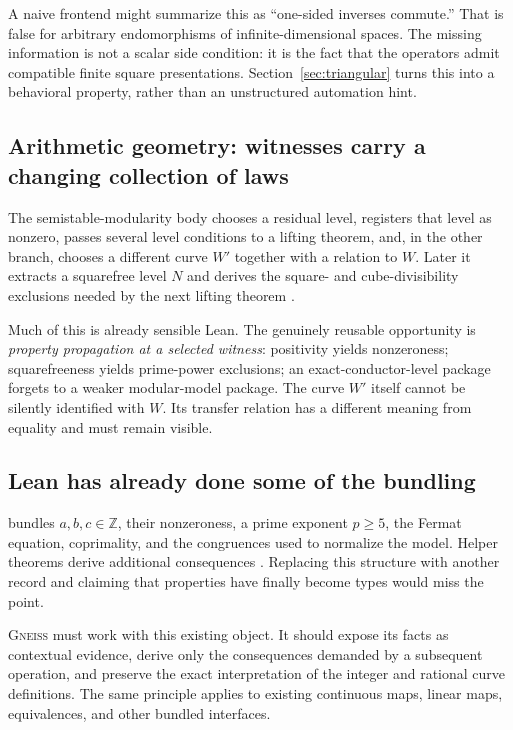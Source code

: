 \documentclass[11pt,letterpaper]{article}
\newcommand{\code}[1]{\texttt{\detokenize{#1}}}
\newcommand{\Gneiss}{\textsc{Gneiss}}
\newcommand{\Z}{\mathbb Z}
\theoremstyle{definition}
\theoremstyle{remark}
\begin{document}
A naive frontend might summarize this as ``one-sided inverses commute.'' That
is false for arbitrary endomorphisms of infinite-dimensional spaces. The
missing information is not a scalar side condition: it is the fact that the
operators admit compatible finite square presentations. Section~\ref{sec:triangular}
turns this into a behavioral property, rather than an unstructured automation
hint.

\subsection{Arithmetic geometry: witnesses carry a changing collection of laws}
The semistable-modularity body chooses a residual level, registers that level as
nonzero, passes several level conditions to a lifting theorem, and, in the other
branch, chooses a different curve $W'$ together with a relation to $W$. Later it
extracts a squarefree level $N$ and derives the square- and cube-divisibility
exclusions needed by the next lifting theorem \cite{flt-modularity}.

Much of this is already sensible Lean. The genuinely reusable opportunity is
\emph{property propagation at a selected witness}: positivity yields nonzeroness;
squarefreeness yields prime-power exclusions; an exact-conductor-level package
forgets to a weaker modular-model package. The curve $W'$ itself cannot be
silently identified with $W$. Its transfer relation has a different meaning from
equality and must remain visible.

\subsection{Lean has already done some of the bundling}
\code{FreyPackage} bundles $a,b,c\in\Z$, their nonzeroness, a prime exponent
$p\ge5$, the Fermat equation, coprimality, and the congruences used to normalize
the model. Helper theorems derive additional consequences
\cite{frey-package}. Replacing this structure with another record and claiming
that properties have finally become types would miss the point.

\Gneiss{} must work with this existing object. It should expose its facts as
contextual evidence, derive only the consequences demanded by a subsequent
operation, and preserve the exact interpretation of the integer and rational
curve definitions. The same principle applies to existing continuous maps,
linear maps, equivalences, and other bundled interfaces.
\end{document}
